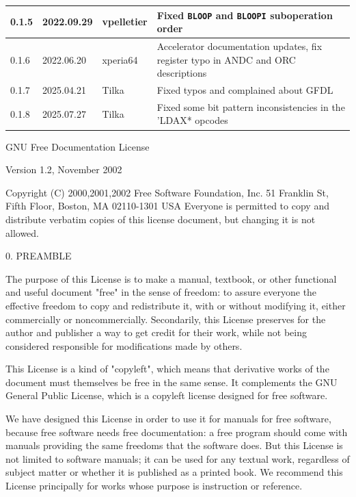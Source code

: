 \documentclass[oneside,english,a4paper,10pt,oneside,openany,final]{memoir}
\begin{document}
\begin{table}[htb]
\begin{tabular}{|p{.5in}|p{.75in}|p{.75in}|p{3.5in}|}
0.1.5            & 2022.09.29    & vpelletier      & Fixed \texttt{BLOOP} and \texttt{BLOOPI} suboperation order \\ \hline
0.1.6            & 2022.06.20    & xperia64        & Accelerator documentation updates, fix register typo in ANDC and ORC descriptions        \\ \hline
0.1.7            & 2025.04.21    & Tilka           & Fixed typos and complained about GFDL                                                    \\ \hline
0.1.8            & 2025.07.27    & Tilka           & Fixed some bit pattern inconsistencies in the 'LDAX* opcodes                             \\ \hline
\end{tabular}
\end{table}

\pagebreak{}


GNU Free Documentation License

Version 1.2, November 2002

  Copyright (C) 2000,2001,2002  Free Software Foundation, Inc.
  51 Franklin St, Fifth Floor, Boston, MA  02110-1301  USA
  Everyone is permitted to copy and distribute verbatim copies
  of this license document, but changing it is not allowed.

0. PREAMBLE

The purpose of this License is to make a manual, textbook, or other functional and useful document "free" in the sense of freedom: to assure everyone the effective freedom to copy and redistribute it, with or without modifying it, either commercially or noncommercially. Secondarily, this License preserves for the author and publisher a way to get credit for their work, while not being considered responsible for modifications made by others.

This License is a kind of "copyleft", which means that derivative works of the document must themselves be free in the same sense. It complements the GNU General Public License, which is a copyleft license designed for free software.

We have designed this License in order to use it for manuals for free software, because free software needs free documentation: a free program should come with manuals providing the same freedoms that the software does. But this License is not limited to software manuals; it can be used for any textual work, regardless of subject matter or whether it is published as a printed book. We recommend this License principally for works whose purpose is instruction or reference.
\end{document}
